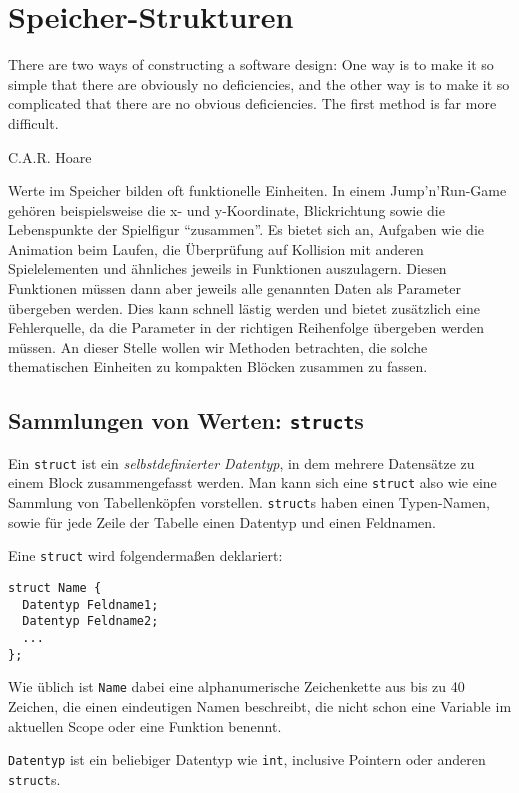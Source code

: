 \chapter{Speicher-Strukturen} \label{chp:structs}
\epigraph{There are two ways of constructing a software design: One way is to make it so simple that there are obviously no deficiencies, and the other way is to make it so complicated that there are no obvious deficiencies. The first method is far more difficult.}
{C.A.R. Hoare}

Werte im Speicher bilden oft funktionelle Einheiten. In einem Jump'n'Run-Game gehören beispielsweise die x- und y-Koordinate, Blickrichtung sowie die Lebenspunkte der Spielfigur \enquote{zusammen}. Es bietet sich an, Aufgaben wie die Animation beim Laufen, die Überprüfung auf Kollision mit anderen Spielelementen und ähnliches jeweils in Funktionen auszulagern. Diesen Funktionen müssen dann aber jeweils alle genannten Daten als Parameter übergeben werden. Dies kann schnell lästig werden und bietet zusätzlich eine Fehlerquelle, da die Parameter in der richtigen Reihenfolge übergeben werden müssen. An dieser Stelle wollen wir Methoden betrachten, die solche thematischen Einheiten zu kompakten Blöcken zusammen zu fassen.

\section{Sammlungen von Werten: \texttt{struct}s}
Ein \texttt{struct} ist ein \emph{selbstdefinierter Datentyp}, in dem mehrere Datensätze zu einem Block zusammengefasst werden. Man kann sich eine \texttt{struct} also wie eine Sammlung von Tabellenköpfen vorstellen. \texttt{struct}s haben einen Typen-Namen, sowie für jede Zeile der Tabelle einen Datentyp und einen Feldnamen.

Eine \texttt{struct} wird folgendermaßen deklariert:
\begin{codebox}
\begin{verbatim}
struct Name {
  Datentyp Feldname1;
  Datentyp Feldname2;
  ...
};
\end{verbatim}
\end{codebox}

Wie üblich ist \texttt{Name} dabei eine alphanumerische Zeichenkette aus bis zu 40 Zeichen, die einen eindeutigen Namen beschreibt, \ie die nicht schon eine Variable im aktuellen Scope oder eine Funktion benennt.

\texttt{Datentyp} ist ein beliebiger Datentyp wie \texttt{int}, inclusive Pointern oder anderen \texttt{struct}s.

